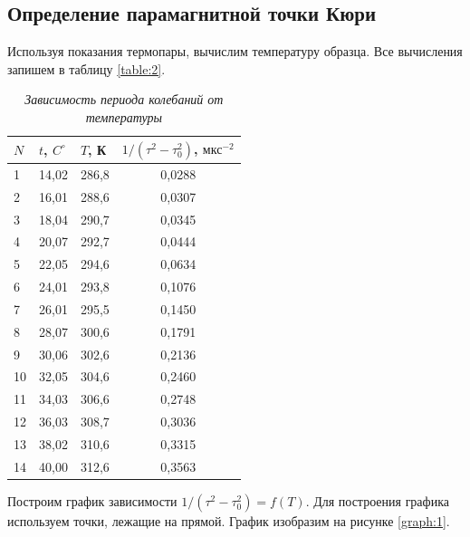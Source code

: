 \documentclass[a4paper,12pt]{article}
\begin{document}
\subsection{Определение парамагнитной точки Кюри}

Используя показания термопары, вычислим температуру образца. Все вычисления запишем в таблицу \ref{table:2}.

\begin{table}[!ht]
    \centering
    \begin{tabular}{|l|l|l|c|}
    \hline
        $N$ & $t$, $C^\circ$ & $T$, К & $1/(\tau^2 - \tau_0^2)$, $\text{мкс}^{-2}$ \\ \hline
        1 & 14,02 & 286,8 & 0,0288 \\ \hline
        2 & 16,01 & 288,6 & 0,0307 \\ \hline
        3 & 18,04 & 290,7 & 0,0345 \\ \hline
        4 & 20,07 & 292,7 & 0,0444 \\ \hline
        5 & 22,05 & 294,6 & 0,0634 \\ \hline
        6 & 24,01 & 293,8 & 0,1076 \\ \hline
        7 & 26,01 & 295,5 & 0,1450 \\ \hline
        8 & 28,07 & 300,6 & 0,1791 \\ \hline
        9 & 30,06 & 302,6 & 0,2136 \\ \hline
        10 & 32,05 & 304,6 & 0,2460 \\ \hline
        11 & 34,03 & 306,6 & 0,2748 \\ \hline
        12 & 36,03 & 308,7 & 0,3036 \\ \hline
        13 & 38,02 & 310,6 & 0,3315 \\ \hline
        14 & 40,00 & 312,6 & 0,3563 \\ \hline
    \end{tabular}\caption{\textit{Зависимость периода колебаний от температуры}}\label{table:1}
\end{table}

Построим график зависимости $1/(\tau^2 - \tau_0^2) = f(T)$. Для построения графика используем точки, лежащие на прямой. График изобразим на рисунке \ref{graph:1}.
\end{document}
